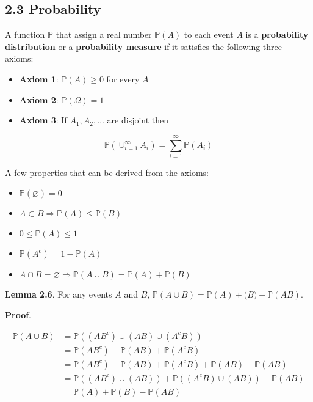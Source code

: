 \subsection{2.3 Probability}\label{probability}

A function \(\mathbb{P}\) that assign a real number \(\mathbb{P}(A)\) to
each event \(A\) is a \textbf{probability distribution} or a
\textbf{probability measure} if it satisfies the following three axioms:

\begin{itemize}[tightlist]
\item
  \textbf{Axiom 1}: \(\mathbb{P}(A) \geq 0\) for every \(A\)
\item
  \textbf{Axiom 2}: \(\mathbb{P}(\Omega) = 1\)
\item
  \textbf{Axiom 3}: If \(A_1, A_2, \dots\) are disjoint then
\end{itemize}

\[ \mathbb{P} \left( \cup_{i=1}^\infty A_i \right) = \sum_{i=1}^\infty \mathbb{P}(A_i) \]

A few properties that can be derived from the axioms:

\begin{itemize}[tightlist]
\item
  \(\mathbb{P}(\varnothing) = 0\)
\item
  \(A \subset B \Rightarrow \mathbb{P}(A) \leq \mathbb{P}(B)\)
\item
  \(0 \leq \mathbb{P}(A) \leq 1\)
\item
  \(\mathbb{P}\left(A^c\right) = 1 - \mathbb{P}(A)\)
\item
  \(A \cap B = \varnothing \Rightarrow \mathbb{P}(A \cup B) = \mathbb{P}(A) + \mathbb{P}(B)\)
\end{itemize}

\textbf{Lemma 2.6}. For any events \(A\) and \(B\),
\(\mathbb{P}(A \cup B) = \mathbb{P}(A) + \mathbb(B) - \mathbb{P}(AB)\).

\textbf{Proof}.

\begin{align}
\mathbb{P}(A \cup B) &= \mathbb{P}\left( (AB^c) \cup (AB) \cup (A^cB) \right) \\
&= \mathbb{P}(AB^c) + \mathbb{P}(AB) + \mathbb{P}(A^cB) \\
&= \mathbb{P}(AB^c) + \mathbb{P}(AB) + \mathbb{P}(A^cB) + \mathbb{P}(AB) - \mathbb{P}(AB) \\
&= \mathbb{P}((AB^c) \cup (AB)) + \mathbb{P}((A^cB) \cup (AB)) - \mathbb{P}(AB) \\
&= \mathbb{P}(A) + \mathbb{P}(B) - \mathbb{P}(AB)
\end{align}


